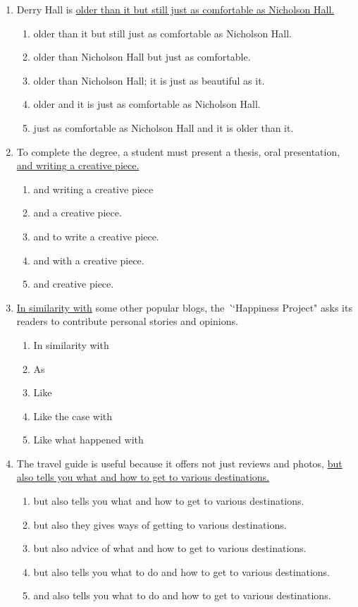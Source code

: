 \documentclass[12pt]{book}
\begin{document}
\begin{enumerate}
\item Derry Hall is \underline{older than it but still just as comfortable as Nicholson Hall.}

\begin{enumerate}[label=(\Alph*)]
\item{older than it but still just as comfortable as Nicholson Hall.}
\item{older than Nicholson Hall but just as comfortable.}
\item{older than Nicholson Hall; it is just as beautiful as it.}
\item{older and it is just as comfortable as Nicholson Hall.}
\item{just as comfortable as Nicholson Hall and it is older than it.}
\end{enumerate}

\bigskip
\item To complete the degree, a student must present a thesis, oral presentation, \ul{and writing a creative piece.}

\begin{enumerate}[label=(\Alph*)]
\item and writing a creative piece
\item and a creative piece.
\item and to write a creative piece.
\item and with a creative piece.
\item and creative piece.
\end{enumerate}

\bigskip
\item \underline{In similarity with} some other popular blogs, the \textit``Happiness Project" asks its readers to contribute personal stories and opinions.
\begin{enumerate}[label=(\Alph*)]
\item In similarity with
\item As
\item Like
\item Like the case with
\item Like what happened with
\end{enumerate}

\newpage
\item The travel guide is useful because it offers not just reviews and photos, \ul{but also tells you what and how to get to various destinations.}
\begin{enumerate}[label=(\Alph*)]
\item but also tells you what and how to get to various destinations.
\item but also they gives ways of getting to various destinations.
\item but also advice of what and how to get to various destinations.
\item but also tells you what to do and how to get to various destinations.
\item and also tells you what to do and how to get to various destinations.
\end{enumerate}


\end{enumerate}
\end{document}
